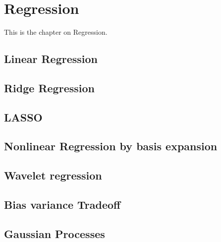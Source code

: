 \documentclass[../../LabBook]{subfiles}
\begin{document}
\section{Regression}
This is the chapter on Regression.
\subsection{Linear Regression}
\subsection{Ridge Regression}
\subsection{LASSO}
\subsection{Nonlinear Regression by basis expansion}
\subsection{Wavelet regression}
\subsection{Bias variance Tradeoff}
\subsection{Gaussian Processes}
\end{document}
